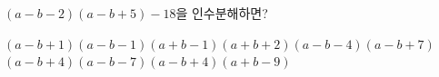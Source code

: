 $(a-b-2)(a-b+5)-18$을 인수분해하면?
\begin{choicesv}{$(a-b+1)(a-b-1)$}{$(a+b-1)(a+b+2)$}{$(a-b-4)(a-b+7)$}{$(a-b+4)(a-b-7)$}{$(a-b+4)(a+b-9)$}\end{choicesv}
